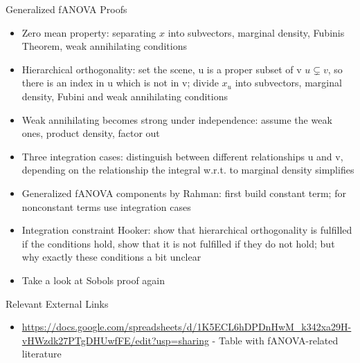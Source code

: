 \begin{frame}{Generalized fANOVA Proofs}
    \begin{itemize}
        \item Zero mean property: separating $x$ into subvectors, marginal density, Fubinis Theorem, weak annihilating conditions
        \item Hierarchical orthogonality: set the scene, u is a proper subset of v $u \subsetneq v$, so there is an index in u which is not in v; divide $x_u$ into subvectors, marginal density, Fubini and weak annihilating conditions
        \item Weak annihilating becomes strong under independence: assume the weak ones, product density, factor out
        \item Three integration cases: distinguish between different relationships u and v, depending on the relationship the integral w.r.t. to marginal density simplifies
        \item Generalized fANOVA components by Rahman: first build constant term; for nonconstant terms use integration cases
        \item Integration constraint Hooker: show that hierarchical orthogonality is fulfilled if the conditions hold, show that it is not fulfilled if they do not hold; but why exactly these conditions a bit unclear
        \item Take a look at Sobols proof again
    \end{itemize}
\end{frame}

\begin{frame}{Relevant External Links}
    \begin{itemize}
        \item \url{https://docs.google.com/spreadsheets/d/1K5ECL6hDPDnHwM_k342xa29H-vHWzdk27PTgDHUwfFE/edit?usp=sharing} - Table with fANOVA-related literature
    \end{itemize}
\end{frame}